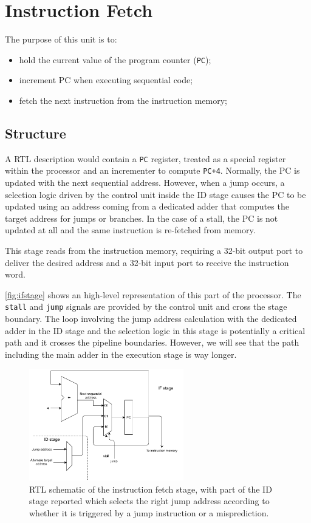 \section{Instruction Fetch}
The purpose of this unit is to:
\begin{itemize}
	\item hold the current value of the program counter (\texttt{PC});
	\item increment PC when executing sequential code;
	\item fetch the next instruction from the instruction memory;
\end{itemize}

\subsection{Structure} A RTL description would contain a \texttt{PC} register, treated as a special register within the processor and an incrementer to compute \texttt{PC+4}. Normally, the PC is updated with the next sequential address. However, when a jump occurs, a selection logic driven by the control unit inside the ID stage causes the PC to be updated using an address coming from a dedicated adder that computes the target address for jumps or branches. In the case of a stall, the PC is not updated at all and the same instruction is re-fetched from memory.

This stage reads from the instruction memory, requiring a 32-bit output port to deliver the desired address and a 32-bit input port to receive the instruction word.

\autoref{fig:ifstage} shows an high-level representation of this part of the processor. The \texttt{stall} and \texttt{jump} signals are provided by the control unit and cross the stage boundary. The loop involving the jump address calculation with the dedicated adder in the ID stage and the selection logic in this stage is potentially a critical path and it crosses the pipeline boundaries. However, we will see that the path including the main adder in the execution stage is way longer.

\begin{figure}[htbp]
	\centering
	\includegraphics[width=0.6\textwidth]{../images/IF.pdf}
	\caption{RTL schematic of the instruction fetch stage, with part of the ID stage reported which selects the right jump address according to whether it is triggered by a jump instruction or a misprediction.}
	\label{fig:ifstage}
\end{figure}
